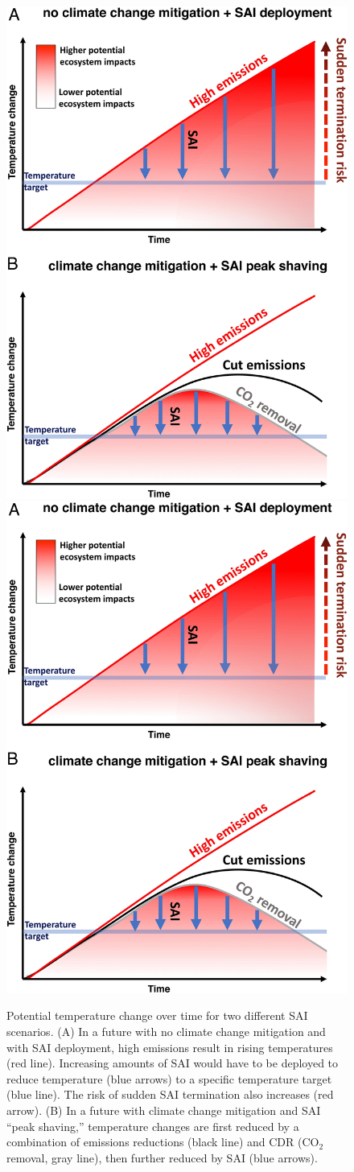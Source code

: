 \begin{figure}
	\begin{center}
		\includegraphics[trim=0cm 52.0cm 0cm 0cm,clip=true,width=0.48\columnwidth]{figures/pnas_fig2.png} \hfill
		\includegraphics[trim=0cm 0cm 0cm 51.89cm,clip=true,width=0.48\columnwidth]{figures/pnas_fig2.png}
	\end{center}
	\caption{Potential temperature change over time for two different SAI scenarios. (A) In a future with no climate change mitigation and with SAI deployment, high emissions result in rising temperatures (red line). Increasing amounts of SAI would have to be deployed to reduce temperature (blue arrows) to a specific temperature target (blue line). The risk of sudden SAI termination also increases (red arrow). (B) In a future with climate change mitigation and SAI ``peak shaving,'' temperature changes are first reduced by a combination of emissions reductions (black line) and CDR (CO$_2$ removal, gray line), then further reduced by SAI (blue arrows).
}
\end{figure}
